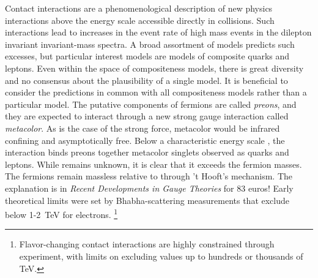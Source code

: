 Contact interactions are a phenomenological description of new physics interactions above the energy scale accessible directly in collisions.
Such interactions lead to increases in the event rate of high mass events in the dilepton invariant invariant-mass spectra. 
A broad assortment of models predicts such excesses, but particular interest models are models of composite quarks and leptons.
Even within the space of compositeness models, there is great diversity and no consensus about the plausibility of a single model. 
It is beneficial to consider the predictions in common with all compositeness models rather than a particular model.
The putative components of fermions are called \emph{preons}, and they are expected to interact through a new strong gauge interaction called \emph{metacolor}.
As is the case of the strong force, metacolor would be infrared confining and asymptotically free.
Below a characteristic energy scale \lam, the interaction binds preons together metacolor singlets observed as quarks and leptons.
While \lam remains unknown, it is clear that it exceeds the fermion masses.
The fermions remain massless relative to \lam through 't Hooft's mechanism. \cite{Eichten:1984eu}
{\color{red} The explanation is in \emph{Recent Developments in Gauge Theories} for 83 euros!}
Early theoretical limits were set by Bhabha-scattering measurements that exclude \lam below 1-2~TeV for electrons. \cite{Eichten:1984eu}
\footnote{Flavor-changing contact interactions are highly constrained through experiment, with limits on \lam excluding values up to hundreds or thousands of TeV.\cite{Eichten:1984eu}}


